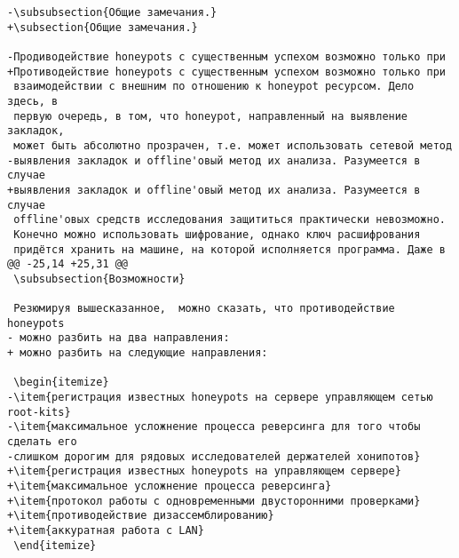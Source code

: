 \begin{verbatim}
-\subsubsection{Общие замечания.}
+\subsection{Общие замечания.}

-Продиводействие honeypots с существенным успехом возможно только при
+Противодействие honeypots с существенным успехом возможно только при
 взаимодействии с внешним по отношению к honeypot ресурсом. Дело здесь, в
 первую очередь, в том, что honeypot, направленный на выявление закладок,
 может быть абсолютно прозрачен, т.е. может использовать сетевой метод
-выявления закладок и offline'овый метод их анализа. Разумеется в случае
+выявления закладок и offline'овый метод их анализа. Разумеется в случае
 offline'овых средств исследования защититься практически невозможно.
 Конечно можно использовать шифрование, однако ключ расшифрования
 придётся хранить на машине, на которой исполняется программа. Даже в
@@ -25,14 +25,31 @@
 \subsubsection{Возможности}

 Резюмируя вышесказанное,  можно сказать, что противодействие honeypots
- можно разбить на два направления:
+ можно разбить на следующие направления:

 \begin{itemize}
-\item{регистрация известных honeypots на сервере управляющем сетью root-kits}
-\item{максимальное усложнение процесса реверсинга для того чтобы сделать его
-слишком дорогим для рядовых исследователей держателей хонипотов}
+\item{регистрация известных honeypots на управляющем сервере}
+\item{максимальное усложнение процесса реверсинга}
+\item{протокол работы с одновременными двусторонними проверками}
+\item{противодействие дизассемблированию}
+\item{аккуратная работа с LAN}
 \end{itemize}


\end{verbatim}

